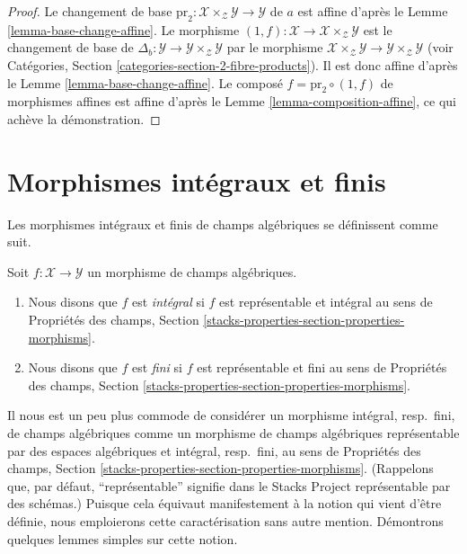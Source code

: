 \begin{proof}
Le changement de base
$\text{pr}_2 : \mathcal{X} \times_\mathcal{Z} \mathcal{Y} \to \mathcal{Y}$
de $a$ est affine d'après le Lemme \ref{lemma-base-change-affine}. Le morphisme
$(1, f) : \mathcal{X} \to \mathcal{X} \times_\mathcal{Z} \mathcal{Y}$
est le changement de base de
$\Delta_b : \mathcal{Y} \to \mathcal{Y} \times_\mathcal{Z} \mathcal{Y}$
par le morphisme $\mathcal{X} \times_\mathcal{Z} \mathcal{Y} \to
\mathcal{Y} \times_\mathcal{Z} \mathcal{Y}$ (voir Catégories, Section
\ref{categories-section-2-fibre-products}). Il est donc affine d'après le
Lemme \ref{lemma-base-change-affine}. Le composé
$f = \text{pr}_2 \circ (1, f)$ de morphismes affines est affine d'après le
Lemme \ref{lemma-composition-affine}, ce qui achève la démonstration.
\end{proof}





\section{Morphismes intégraux et finis}
\label{section-integral}

\noindent
Les morphismes intégraux et finis de champs algébriques se définissent comme
suit.

\begin{definition}
\label{definition-integral}
Soit $f : \mathcal{X} \to \mathcal{Y}$ un morphisme de champs algébriques.
\begin{enumerate}
\item Nous disons que $f$ est {\it intégral} si $f$ est représentable et
intégral au sens de Propriétés des champs, Section
\ref{stacks-properties-section-properties-morphisms}.
\item Nous disons que $f$ est {\it fini} si $f$ est représentable et fini au
sens de Propriétés des champs, Section
\ref{stacks-properties-section-properties-morphisms}.
\end{enumerate}
\end{definition}

\noindent
Il nous est un peu plus commode de considérer un morphisme intégral, resp.\
fini, de champs algébriques comme un morphisme de champs algébriques
représentable par des espaces algébriques et intégral, resp.\ fini, au sens de
Propriétés des champs, Section
\ref{stacks-properties-section-properties-morphisms}.
(Rappelons que, par défaut, ``représentable'' signifie dans le Stacks Project
représentable par des schémas.) Puisque cela équivaut manifestement à la notion
qui vient d'être définie, nous emploierons cette caractérisation sans autre
mention. Démontrons quelques lemmes simples sur cette notion.

